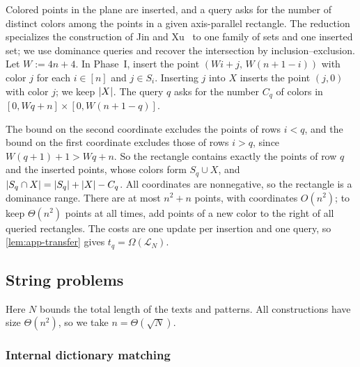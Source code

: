 Colored points in the plane are inserted, and a query asks for the number of distinct colors among the points in a given axis-parallel rectangle. The reduction specializes the construction of Jin and Xu~\cite[Section~3.4, proof of Theorem~1.8]{jin_tight_2022} to one family of sets and one inserted set; we use dominance queries and recover the intersection by inclusion--exclusion. Let $W:=4n+4$. In Phase~I, insert the point $(Wi+j,\,W(n+1-i))$ with color $j$ for each $i\in[n]$ and $j\in S_i$. Inserting $j$ into $X$ inserts the point $(j,0)$ with color $j$; we keep $\left|X\right|$. The query $q$ asks for the number $C_q$ of colors in $[0,Wq+n]\times[0,W(n+1-q)]$.

The bound on the second coordinate excludes the points of rows $i<q$, and the bound on the first coordinate excludes those of rows $i>q$, since $W(q+1)+1>Wq+n$. So the rectangle contains exactly the points of row $q$ and the inserted points, whose colors form $S_q\cup X$, and $\left|S_q\cap X\right|=\left|S_q\right|+\left|X\right|-C_q$. All coordinates are nonnegative, so the rectangle is a dominance range. There are at most $n^2+n$ points, with coordinates $O(n^2)$; to keep $\Theta(n^2)$ points at all times, add points of a new color to the right of all queried rectangles. The costs are one update per insertion and one query, so \cref{lem:app-transfer} gives $t_q=\Omega(\mathcal L_N)$.

\subsection{String problems}\label{sec:strings}

Here $N$ bounds the total length of the texts and patterns. All constructions have size $\Theta(n^2)$, so we take $n=\Theta(\sqrt N)$.

\subsubsection{Internal dictionary matching}\label{sec:internal-dictionary}

